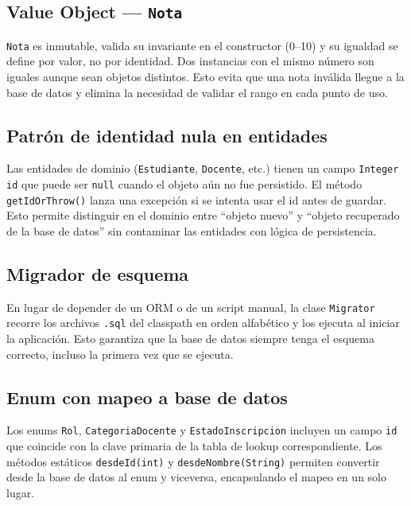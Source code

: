 \documentclass[12pt,a4paper]{article}
\begin{document}
\subsection*{Value Object --- \texttt{Nota}}

\texttt{Nota} es inmutable, valida su invariante en el constructor (0--10)
y su igualdad se define por valor, no por identidad. Dos instancias con el
mismo número son iguales aunque sean objetos distintos. Esto evita que una
nota inválida llegue a la base de datos y elimina la necesidad de validar
el rango en cada punto de uso.

\subsection*{Patrón de identidad nula en entidades}

Las entidades de dominio (\texttt{Estudiante}, \texttt{Docente}, etc.)
tienen un campo \texttt{Integer id} que puede ser \texttt{null} cuando el
objeto aún no fue persistido. El método \texttt{getIdOrThrow()} lanza una
excepción si se intenta usar el id antes de guardar. Esto permite
distinguir en el dominio entre ``objeto nuevo'' y ``objeto recuperado de la
base de datos'' sin contaminar las entidades con lógica de persistencia.

\subsection*{Migrador de esquema}

En lugar de depender de un ORM o de un script manual, la clase
\texttt{Migrator} recorre los archivos \texttt{.sql} del classpath en orden
alfabético y los ejecuta al iniciar la aplicación. Esto garantiza que la
base de datos siempre tenga el esquema correcto, incluso la primera vez que
se ejecuta.

\subsection*{Enum con mapeo a base de datos}

Los enums \texttt{Rol}, \texttt{CategoriaDocente} y
\texttt{EstadoInscripcion} incluyen un campo \texttt{id} que coincide con
la clave primaria de la tabla de lookup correspondiente. Los métodos
estáticos \texttt{desdeId(int)} y \texttt{desdeNombre(String)} permiten
convertir desde la base de datos al enum y viceversa, encapsulando el
mapeo en un solo lugar.

\end{document}
